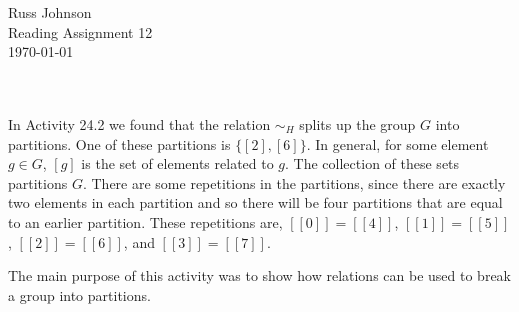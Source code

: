 \documentclass[11pt,a4paper]{article}
\begin{document}
\begin{flushright}
Russ Johnson\\
Reading Assignment 12\\
\today\\
\end{flushright}
~\\
~\\
In Activity 24.2 we found that the relation $\sim_H$ splits up the group $G$ into partitions. One of these partitions is $\{[2],[6]\}$. In general, for some element $g\in G$, $[g]$ is the set of elements related to $g$. The collection of these sets partitions $G$. There are some repetitions in the partitions, since there are exactly two elements in each partition and so there will be four partitions that are equal to an earlier partition. These repetitions are, $[[0]]=[[4]]$, $[[1]]=[[5]]$, $[[2]]=[[6]]$, and $[[3]]=[[7]]$.

The main purpose of this activity was to show how relations can be used to break a group into partitions.
\end{document}
